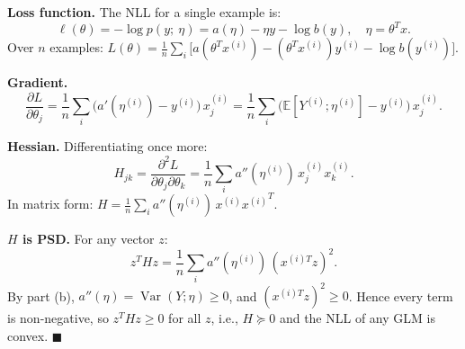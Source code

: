 \begin{answer}
\textbf{Loss function.} The NLL for a single example is:
\[
\ell(\theta) = -\log p(y;\ \eta) = a(\eta) - \eta y - \log b(y), \quad \eta = \theta^T x.
\]
Over $n$ examples: $L(\theta) = \frac{1}{n}\sum_i \bigl[a(\theta^T x^{(i)}) - (\theta^T x^{(i)})y^{(i)} - \log b(y^{(i)})\bigr]$.

\textbf{Gradient.}
\[
\frac{\partial L}{\partial \theta_j} = \frac{1}{n}\sum_i \bigl(a'(\eta^{(i)}) - y^{(i)}\bigr)\,x_j^{(i)}
= \frac{1}{n}\sum_i \bigl(\mathbb{E}[Y^{(i)};\eta^{(i)}] - y^{(i)}\bigr)\,x_j^{(i)}.
\]

\textbf{Hessian.} Differentiating once more:
\[
H_{jk} = \frac{\partial^2 L}{\partial\theta_j\partial\theta_k}
= \frac{1}{n}\sum_i a''(\eta^{(i)})\,x_j^{(i)} x_k^{(i)}.
\]
In matrix form: $H = \frac{1}{n}\sum_i a''(\eta^{(i)})\,x^{(i)}{x^{(i)}}^T$.

\textbf{$H$ is PSD.} For any vector $z$:
\[
z^T H z = \frac{1}{n}\sum_i a''(\eta^{(i)})\,(x^{(i)T}z)^2.
\]
By part (b), $a''(\eta) = \operatorname{Var}(Y;\eta) \ge 0$, and $(x^{(i)T}z)^2 \ge 0$. Hence every term is non-negative, so $z^T H z \ge 0$ for all $z$, i.e., $H \succeq 0$ and the NLL of any GLM is convex. $\blacksquare$
\end{answer}
